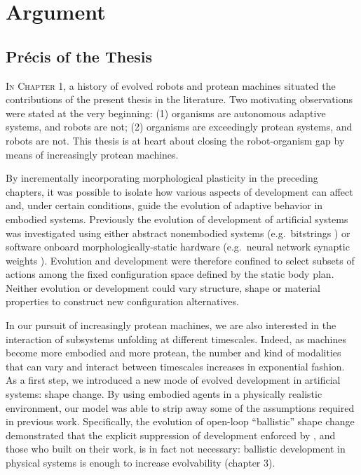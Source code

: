 

\chapter{Argument}


\section{Pr\'{e}cis of the Thesis}

\textsc{In Chapter 1,}
a history of 
evolved robots 
and protean machines 
situated the contributions of the present thesis in the literature.
Two motivating observations were stated at the very beginning:
(1) organisms are autonomous adaptive systems, and robots are not;
(2) organisms are exceedingly protean systems, and robots are not.
This thesis is at heart about closing the robot-organism gap by means of increasingly protean machines.


By incrementally incorporating morphological plasticity in the preceding chapters, it was possible to isolate how various aspects of development can affect and, under certain conditions, guide the evolution of adaptive behavior in embodied systems.
Previously the evolution of development of artificial systems was investigated using either abstract nonembodied systems (e.g.~bitstrings \cite{hinton1987learning})
or software onboard morphologically-static hardware
(e.g.~neural network synaptic weights \cite{husbands1998better,floreano1996plastic}).
Evolution and development were therefore confined to select subsets of actions among the fixed configuration space defined by the static body plan.
Neither evolution or development could vary structure, shape or material properties to construct new configuration alternatives.

In our pursuit of 
increasingly protean machines,
we are also interested in the interaction of subsystems unfolding at different timescales.
Indeed, as machines become more embodied \cite{klyubin2005empowerment} and more protean, the number and kind of modalities that can vary and interact between timescales increases in exponential fashion.
As a first step,
we introduced
a new mode of evolved development in artificial systems: shape change.
By using embodied agents in a physically realistic environment,
our model was able to strip away some of the assumptions required in previous work.
Specifically,
the evolution of open-loop ``ballistic'' shape change demonstrated that the explicit suppression of development enforced by \citet{hinton1987learning}, and those who built on their work,
is in fact not necessary: ballistic development in physical systems is enough to increase evolvability (chapter 3).



